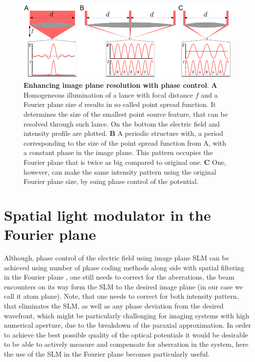 \begin{figure}[t]
	\centering
	\includegraphics[scale=1]{figures/DMD_lance.pdf}
	\caption{{\bf Enhancing image plane resolution with phase control}. {\bf A} Homogeneous illumination of a lance with focal distance $f$ and a Fourier plane size $d$ results in so called point spread function. It determines the size of the smallest point source feature, that can be resolved through such lance. On the bottom the electric field and intensity profile are plotted. {\bf B} A periodic structure with, a period corresponding to the size of the point spread function from A, with a constant phase in the image plane. This pattern occupies the Fourier plane that is twice as big compared to original one. {\bf C} One, however, can make the same intensity pattern using the original Fourier plane size, by suing phase control of the potential.}
	\label{fig:DMD_lance}
\end{figure}



\section{Spatial light modulator in the Fourier plane}
Although, phase control of the electric field using image plane SLM can be achieved using number of phase coding methods along side with spatial filtering in the Fourier plane \cite{Lee1970, Goorden2014}, one still needs to correct for the aberrations, the beam encounters on its way form the SLM to the desired image plane (in our case we call it atom plane). Note, that one needs to correct for both intensity pattern, that eliminates the SLM, as well as any phase deviation from the desired wavefront, which might be particularly challenging for imaging systems with high numerical aperture, due to the breakdown of the paraxial approximation. In order to achieve the best possible quality of the optical potentials it would be desirable to be able to actively measure and compensate for aberration in the system, here the use of the SLM in the Fourier plane becomes particularly useful.

